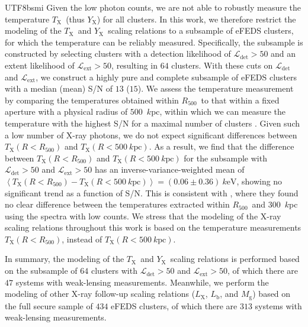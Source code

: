 \documentclass[longauth]{aa}
\newcommand{\Rfiveoo}{\ensuremath{R_{500}}}
\newcommand{\Lx}{\ensuremath{L_{\mathrm{X}}}}
\newcommand{\Lb}{\ensuremath{L_{\mathrm{b}}}}
\newcommand{\Tx}{\ensuremath{T_{\mathrm{X}}}}
\newcommand{\Yx}{\ensuremath{Y_{\mathrm{X}}}}
\newcommand{\Mg}{\ensuremath{M_{\mathrm{g}}}}
\begin{document}
\begin{CJK*}{UTF8}{bsmi}
Given the low photon counts, we are not able to robustly measure the temperature \Tx\ (thus \Yx) for all clusters.
In this work, we therefore restrict the modeling of the \Tx\ and \Yx\ scaling relations to a subsample of eFEDS clusters, for which the temperature can be reliably measured.
Specifically, the subsample is constructed by selecting clusters with a detection likelihood of $\mathcal{L}_{\mathrm{det}} > 50$ and an extent likelihood of $\mathcal{L}_{\mathrm{ext}} > 50$, resulting in $64$ clusters.
With these cuts on $\mathcal{L}_{\mathrm{det}}$ and $\mathcal{L}_{\mathrm{ext}}$, we construct a highly pure and complete subsample of eFEDS clusters with a median (mean) S/N of $13$ ($15$).
We assess the temperature measurement by comparing the temperatures obtained within \Rfiveoo\ to that within a fixed aperture with a physical radius of $500$~$k$pc, within which we can measure the temperature with the highest S/N for a maximal number of clusters \citep{liu21}. 
Given such a low number of X-ray photons, we do not expect significant differences between $\Tx(R<\Rfiveoo)$ and $\Tx(R<500~k\mathrm{pc})$.
As a result, we find that the difference between $\Tx(R<\Rfiveoo)$ and $\Tx(R<500~k\mathrm{pc})$ for the subsample with $\mathcal{L}_{\mathrm{det}} > 50$ and $\mathcal{L}_{\mathrm{ext}} > 50$ has an inverse-variance-weighted mean of $\left\langle\Tx(R<\Rfiveoo) - \Tx(R<500~k\mathrm{pc})\right\rangle = \left(0.06\pm0.36\right)~k\mathrm{eV}$,
showing no significant trend as a function of S/N.
This is consistent with \cite{giles16}, where they found no clear difference between the temperatures extracted within \Rfiveoo\ and $300$~$k$pc using the spectra with low counts.
We stress that the modeling of the X-ray scaling relations throughout this work is based on the temperature measurements $\Tx(R<\Rfiveoo)$, instead of $\Tx(R<500~k\mathrm{pc})$.


In summary, the modeling of the \Tx\ and \Yx\ scaling relations is performed based on the subsample of $64$ clusters with $\mathcal{L}_{\mathrm{det}} > 50$ and $\mathcal{L}_{\mathrm{ext}} > 50$, of which there are $47$ systems with weak-lensing measurements.
Meanwhile, we perform the modeling of other X-ray follow-up scaling relations (\Lx, \Lb, and \Mg) based on the full secure sample of $434$ eFEDS clusters, of which there are $313$ systems with weak-lensing measurements.



%
%


\end{CJK*}
\end{document}
